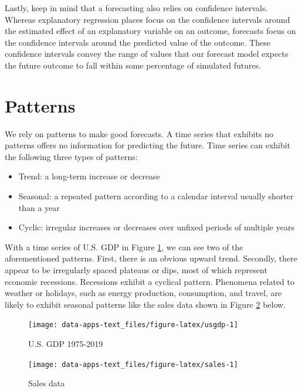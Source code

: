 \documentclass[
]{book}
\providecommand{\tightlist}{%
  \setlength{\itemsep}{0pt}\setlength{\parskip}{0pt}}
\begin{document}
Lastly, keep in mind that a forecasting also relies on confidence intervals. Whereas explanatory regression places focus on the confidence intervals around the estimated effect of an explanatory variable on an outcome, forecasts focus on the confidence intervals around the predicted value of the outcome. These confidence intervals convey the range of values that our forecast model expects the future outcome to fall within some percentage of simulated futures.

\hypertarget{patterns}{%
\section{Patterns}\label{patterns}}

We rely on patterns to make good forecasts. A time series that exhibits no patterns offers no information for predicting the future. Time series can exhibit the following three types of patterns:

\begin{itemize}
\tightlist
\item
  Trend: a long-term increase or decrease
\item
  Seasonal: a repeated pattern according to a calendar interval usually shorter than a year
\item
  Cyclic: irregular increases or decreases over unfixed periods of multiple years
\end{itemize}

With a time series of U.S. GDP in Figure \ref{fig:usgdp}, we can see two of the aforementioned patterns. First, there is an obvious upward trend. Secondly, there appear to be irregularly spaced plateaus or dips, most of which represent economic recessions. Recessions exhibit a cyclical pattern. Phenomena related to weather or holidays, such as energy production, consumption, and travel, are likely to exhibit seasonal patterns like the sales data shown in Figure \ref{fig:sales} below.

\begin{figure}

{\centering \texttt{[image: data-apps-text\_files/figure-latex/usgdp-1]} 

}

\caption{U.S. GDP 1975-2019}\label{fig:usgdp}
\end{figure}

\begin{figure}

{\centering \texttt{[image: data-apps-text\_files/figure-latex/sales-1]} 

}

\caption{Sales data}\label{fig:sales}
\end{figure}
\end{document}
